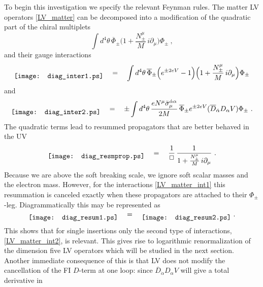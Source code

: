 \documentclass[12pt]{revtex4}
\begin{document}
To begin this investigation we specify the relevant Feynman rules. 
The matter LV operators \eqref{LV_matter} can be decomposed into
a modification of the quadratic part of the chiral multiplets 
\begin{equation} 
\int d^4\theta\, 
\overline{\Phi}_\pm 
\Big( 1 + \frac{N_\pm^\mu}{M} \, i \partial_\mu  \Big) 
\Phi_\pm~, 
\end{equation}
and their gauge interactions
\begin{equation} 
\raisebox{-1ex}{\texttt{[image: diag\_inter1.ps]}}
\quad = \quad 
\int d^4\theta\, 
\overline{\Phi}_\pm 
\Big(  e^{\pm 2 e V} - 1 \Big) 
\Big( 1 + \frac{N_\pm^\mu}{M} \, i \partial_\mu  \Big) 
\Phi_\pm
\label{LV_matter_int1}
\end{equation}
and 
\begin{equation}
\raisebox{-1ex}{\texttt{[image: diag\_inter2.ps]}}
\quad = \quad 
\pm \int d^4\theta\, 
\frac {e N^\mu \bar\sigma_\mu^{\dot\alpha\alpha}}{2M}\, 
\overline{\Phi}_\pm 
e^{\pm 2eV} 
( \overline{D}_{\dot\alpha} D_\alpha V) 
\Phi_\pm~. 
\label{LV_matter_int2}
\end{equation} 
The quadratic terms lead to resummed  propagators that are better
behaved in the UV 
\begin{equation} 
\raisebox{-1ex}{\texttt{[image: diag\_resmprop.ps]}}
\quad = \quad 
\frac 1{\Box}\,  \frac 1{1 +  \frac{ N_\pm^\mu} M \, i\partial_\mu}~. 
\end{equation} 
Because we are above the soft breaking scale, we ignore soft scalar 
masses and the electron mass.
However, for the interactions \eqref{LV_matter_int1} this 
resummation is canceled exactly when these propagators are 
attached to their $\Phi_\pm$-leg. Diagrammatically this may be
represented as  
\begin{equation}
\raisebox{-1ex}{\texttt{[image: diag\_resum1.ps]}}
\quad = \quad 
\raisebox{-1ex}{\texttt{[image: diag\_resum2.ps]}}
~. 
\label{ResummedPropVer}
\end{equation}
This shows that for single insertions only the second type of
interactions, \eqref{LV_matter_int2}, is relevant. This gives rise to
logarithmic renormalization of the dimension five LV operators which
will be studied in the next section. 
Another immediate consequence of this is that LV does not 
modify the cancellation of the FI $D$-term at one loop: since
$\overline{D}_{\dot\alpha} D_\alpha V$ will give a total derivative in
\end{document}
